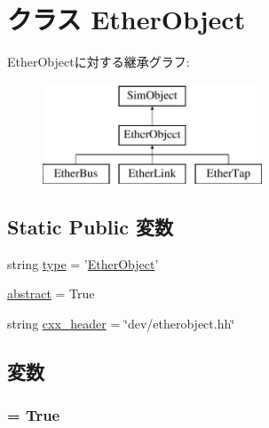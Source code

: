 \hypertarget{classEthernet_1_1EtherObject}{
\section{クラス EtherObject}
\label{classEthernet_1_1EtherObject}
}
EtherObjectに対する継承グラフ:\begin{figure}[H]
\begin{center}
\leavevmode
\includegraphics[height=3cm]{classEthernet_1_1EtherObject}
\end{center}
\end{figure}
\subsection*{Static Public 変数}
\begin{DoxyCompactItemize}
\item 
string \hyperlink{classEthernet_1_1EtherObject_acce15679d830831b0bbe8ebc2a60b2ca}{type} = '\hyperlink{classEthernet_1_1EtherObject}{EtherObject}'
\item 
\hyperlink{classEthernet_1_1EtherObject_a17fa61ac3806b481cafee5593b55e5d0}{abstract} = True
\item 
string \hyperlink{classEthernet_1_1EtherObject_a17da7064bc5c518791f0c891eff05fda}{cxx\_\-header} = \char`\"{}dev/etherobject.hh\char`\"{}
\end{DoxyCompactItemize}


\subsection{変数}
\hypertarget{classEthernet_1_1EtherObject_a17fa61ac3806b481cafee5593b55e5d0}{
\subsubsection[{abstract}]{ = True}}
\label{classEthernet_1_1EtherObject_a17fa61ac3806b481cafee5593b55e5d0}


